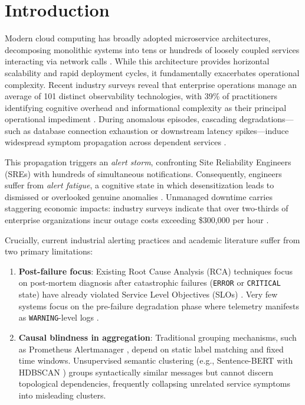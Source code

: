 \documentclass[conference]{IEEEtran}
\begin{document}
\section{Introduction}
Modern cloud computing has broadly adopted microservice architectures, decomposing monolithic systems into tens or hundreds of loosely coupled services interacting via network calls \cite{kuang2024cola, pham2025rcaeval}. While this architecture provides horizontal scalability and rapid deployment cycles, it fundamentally exacerbates operational complexity. Recent industry surveys reveal that enterprise operations manage an average of 101 distinct observability technologies, with 39\% of practitioners identifying cognitive overhead and informational complexity as their principal operational impediment \cite{grafana2025}. During anomalous episodes, cascading degradations—such as database connection exhaustion or downstream latency spikes—induce widespread symptom propagation across dependent services \cite{kuang2024cola, yu2025alertguardian}.

This propagation triggers an \textit{alert storm}, confronting Site Reliability Engineers (SREs) with hundreds of simultaneous notifications. Consequently, engineers suffer from \textit{alert fatigue}, a cognitive state in which desensitization leads to dismissed or overlooked genuine anomalies \cite{pagerduty2020, tariq2025alertfatigue, jalalvand2024alertprioritisation}. Unmanaged downtime carries staggering economic impacts: industry surveys indicate that over two-thirds of enterprise organizations incur outage costs exceeding \$300,000 per hour \cite{pagerduty2026, itic2024downtime}.

Crucially, current industrial alerting practices and academic literature suffer from two primary limitations:
\begin{enumerate}
    \item \textbf{Post-failure focus}: Existing Root Cause Analysis (RCA) techniques focus on post-mortem diagnosis after catastrophic failures (\texttt{ERROR} or \texttt{CRITICAL} state) have already violated Service Level Objectives (SLOs) \cite{sre-workbook-ch5, pham2025rcaeval}. Very few systems focus on the pre-failure degradation phase where telemetry manifests as \texttt{WARNING}-level logs \cite{mendes2021loglevels}.
    \item \textbf{Causal blindness in aggregation}: Traditional grouping mechanisms, such as Prometheus Alertmanager \cite{prometheus-alertmanager}, depend on static label matching and fixed time windows. Unsupervised semantic clustering (e.g., Sentence-BERT with HDBSCAN \cite{sbert, hdbscan}) groups syntactically similar messages but cannot discern topological dependencies, frequently collapsing unrelated service symptoms into misleading clusters.
\end{enumerate}
\end{document}
